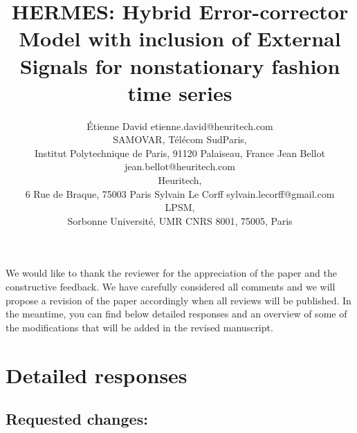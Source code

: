 \documentclass[10pt]{article} %
\title{HERMES: Hybrid Error-corrector Model with inclusion of External Signals for nonstationary fashion time series}
\author{\name \'Etienne David \email etienne.david@heuritech.com \\
      \addr SAMOVAR, Télécom SudParis,\\
      Institut Polytechnique de Paris, 91120 Palaiseau, France
      \AND
      \name Jean Bellot \email jean.bellot@heuritech.com \\
      \addr Heuritech, \\
      6 Rue de Braque, 75003 Paris
      \AND
      \name Sylvain Le Corff \email sylvain.lecorff@gmail.com\\
      \addr LPSM, \\
      Sorbonne Université, UMR CNRS 8001, 75005, Paris
      }
\begin{document}
\maketitle

We would like to thank the reviewer for the appreciation of the paper and the constructive feedback. We have carefully considered all comments and we will propose a revision of the paper accordingly when all reviews will be published. In the meantime, you can find below detailed responses and an overview of some of the  modifications that will be added in the revised manuscript.

\section*{Detailed responses}

\subsection*{Requested changes:}
\end{document}
